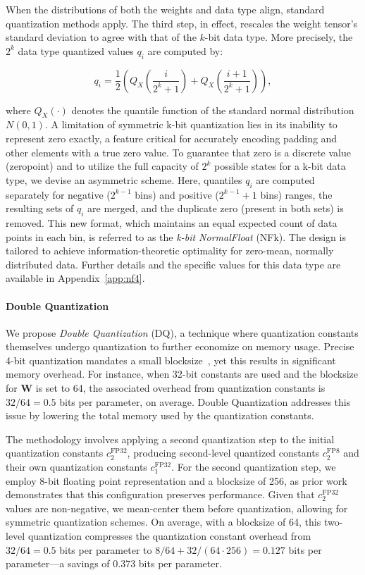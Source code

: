 When the distributions of both the weights and data type align, standard quantization methods apply. The third step, in effect, rescales the weight tensor’s standard deviation to agree with that of the $k$-bit data type. More precisely, the $2^k$ data type quantized values $q_i$ are computed by:

\begin{equation}
q_i  = \frac{1}{2}\left( Q_X\left(\frac{i}{2^k+1}\right) + Q_X\left(\frac{i+1}{2^k+1}\right)\right),
\end{equation}

where $Q_X(\cdot)$ denotes the quantile function of the standard normal distribution $N(0,1)$. A limitation of symmetric k-bit quantization lies in its inability to represent zero exactly, a feature critical for accurately encoding padding and other elements with a true zero value. To guarantee that zero is a discrete value (zeropoint) and to utilize the full capacity of $2^k$ possible states for a k-bit data type, we devise an asymmetric scheme. Here, quantiles $q_i$ are computed separately for negative ($2^{k-1}$ bins) and positive ($2^{k-1} + 1$ bins) ranges, the resulting sets of $q_i$ are merged, and the duplicate zero (present in both sets) is removed. This new format, which maintains an equal expected count of data points in each bin, is referred to as the \emph{k-bit NormalFloat} (NFk). The design is tailored to achieve information-theoretic optimality for zero-mean, normally distributed data. Further details and the specific values for this data type are available in Appendix~\ref{app:nf4}.

\paragraph{Double Quantization{}} 
We propose \emph{Double Quantization} (DQ), a technique where quantization constants themselves undergo quantization to further economize on memory usage. Precise 4-bit quantization mandates a small blocksize~\citep{dettmers2022case}, yet this results in significant memory overhead. For instance, when 32-bit constants are used and the blocksize for $\mathbf{W}$ is set to 64, the associated overhead from quantization constants is $32/64 = 0.5$ bits per parameter, on average. Double Quantization addresses this issue by lowering the total memory used by the quantization constants.

The methodology involves applying a second quantization step to the initial quantization constants $c_2^{\text{FP32}}$, producing second-level quantized constants $c_2^{\text{FP8}}$ and their own quantization constants $c_1^{\text{FP32}}$. For the second quantization step, we employ 8-bit floating point representation and a blocksize of 256, as prior work~\citep{dettmers2022case} demonstrates that this configuration preserves performance. Given that $c_2^{\text{FP32}}$ values are non-negative, we mean-center them before quantization, allowing for symmetric quantization schemes. On average, with a blocksize of 64, this two-level quantization compresses the quantization constant overhead from $32/64=0.5$ bits per parameter to $8/64 + 32/(64\cdot256) = 0.127$ bits per parameter—a savings of 0.373 bits per parameter.

